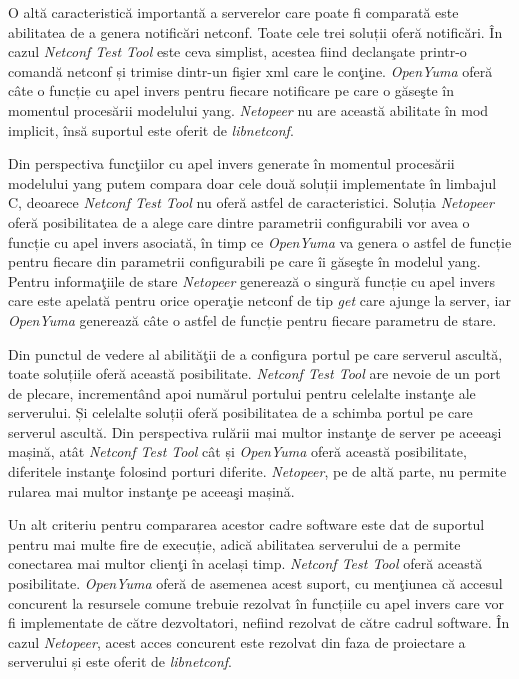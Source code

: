 O altă caracteristică importantă a serverelor care poate fi comparată este abilitatea de a genera notificări \gls{netconf}. Toate cele trei soluții oferă notificări. În cazul \textit{Netconf Test Tool} este ceva simplist, acestea fiind declanşate printr-o comandă \gls{netconf} și trimise dintr-un fişier \gls{xml} care le conţine. \textit{OpenYuma} oferă câte o funcție cu apel invers pentru fiecare notificare pe care o găseşte în momentul procesării modelului \gls{yang}. \textit{Netopeer} nu are această abilitate în mod implicit, însă suportul este oferit de \textit{libnetconf}.

Din perspectiva funcţiilor cu apel invers generate în momentul procesării modelului \gls{yang} putem compara doar cele două soluții implementate în limbajul C, deoarece \textit{Netconf Test Tool} nu oferă astfel de caracteristici. Soluția \textit{Netopeer} oferă posibilitatea de a alege care dintre parametrii configurabili vor avea o funcție cu apel invers asociată, în timp ce \textit{OpenYuma} va genera o astfel de funcție pentru fiecare din parametrii configurabili pe care îi găseşte în modelul \gls{yang}. Pentru informaţiile de stare \textit{Netopeer} generează o singură funcție cu apel invers care este apelată pentru orice operaţie \gls{netconf} de tip \textit{get} care ajunge la server, iar \textit{OpenYuma} generează câte o astfel de funcție pentru fiecare parametru de stare.

Din punctul de vedere al abilităţii de a configura portul pe care serverul ascultă, toate soluțiile oferă această posibilitate. \textit{Netconf Test Tool} are nevoie de un port de plecare, incrementând apoi numărul portului pentru celelalte instanţe ale serverului. Și celelalte soluții oferă posibilitatea de a schimba portul pe care serverul ascultă. Din perspectiva rulării mai multor instanţe de server pe aceeaşi mașină, atât \textit{Netconf Test Tool} cât și \textit{OpenYuma} oferă această posibilitate, diferitele instanţe folosind porturi diferite. \textit{Netopeer}, pe de altă parte, nu permite rularea mai multor instanţe pe aceeaşi mașină.

Un alt criteriu pentru compararea acestor cadre software este dat de suportul pentru mai multe fire de execuție, adică abilitatea serverului de a permite conectarea mai multor clienţi în același timp. \textit{Netconf Test Tool} oferă această posibilitate. \textit{OpenYuma} oferă de asemenea acest suport, cu menţiunea că accesul concurent la resursele comune trebuie rezolvat în funcțiile cu apel invers care vor fi implementate de către dezvoltatori, nefiind rezolvat de către cadrul software. În cazul \textit{Netopeer}, acest acces concurent este rezolvat din faza de proiectare a serverului și este oferit de \textit{libnetconf}.

